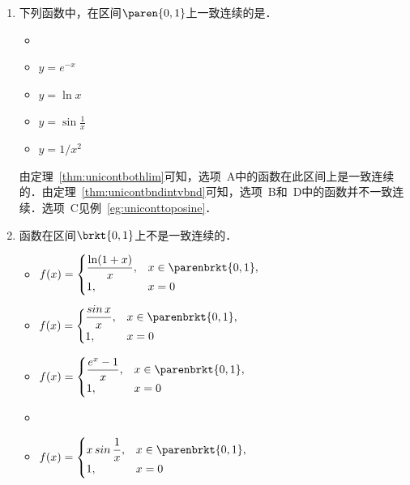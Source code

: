 \begin{enumerate}
\item 下列函数中，在区间\(\paren{0,1}\)上一致连续的是\uline{\makebox[6em]{}}．
  \begin{itemize}
    \renewcommand{\labelitemi}{\faCircleThin}
    \ifshowsol
    \item[\faCircle]
    \else
    \item
    \fi
    \(y = e^{-x}\)
  \item \(y = \ln x\)
  \item \(y = \sin\frac1x\)     %
  \item \(y = 1/x^2\)
  \end{itemize}

  \ifshowsol
    由定理~\ref{thm:unicontbothlim}可知，选项~A中的函数在此区间上是一致连续的．由定理~\ref{thm:unicontbndintvbnd}可知，选项~B和~D中的函数并不一致连续．选项~C见例~\ref{eg:uniconttoposine}．
  \fi

\item 函数\uline{\hspace{10em}}在区间\(\brkt{0,1}\)上不是一致连续的．
  \begin{itemize}
    \renewcommand{\labelitemi}{\faCircleThin}
  \item
    \begin{math}
      f(x) =
      \begin{cases}
        \dfrac{\ln(1+x)}{x}, & x \in \parenbrkt{0,1}, \\
        1, & x = 0
      \end{cases}
    \end{math}
  \item
    \begin{math}
      f(x) =
      \begin{cases}
        \dfrac{\sin x}{x}, & x \in \parenbrkt{0,1}, \\
        1, & x = 0
      \end{cases}
    \end{math}
  \item
    \begin{math}
      f(x) =
      \begin{cases}
        \dfrac{e^x-1}{x}, & x \in \parenbrkt{0,1}, \\
        1, & x = 0
      \end{cases}
    \end{math}
    \ifshowsol
    \item[\faCircle]
    \else
    \item
    \fi
    \begin{math}
      f(x) =
      \begin{cases}
        x \sin\dfrac1x, & x \in \parenbrkt{0,1}, \\
        1, & x = 0
      \end{cases}
    \end{math}
  \end{itemize}


\end{enumerate}
